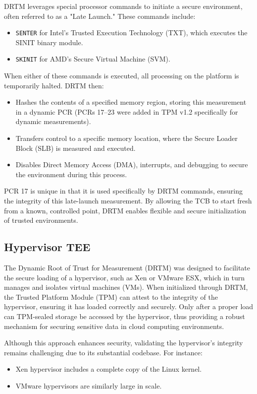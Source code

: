 DRTM leverages special processor commands to initiate a secure
environment, often referred to as a "Late Launch." These commands
include:
\begin{itemize}
    \item \texttt{SENTER} for Intel's Trusted Execution Technology
      (TXT), which executes the SINIT binary module.
    \item \texttt{SKINIT} for AMD's Secure Virtual Machine (SVM).
\end{itemize}

When either of these commands is executed, all processing on the
platform is temporarily halted. DRTM then:
\begin{itemize}
    \item Hashes the contents of a specified memory region, storing
      this measurement in a dynamic PCR (PCRs 17–23 were added in TPM
      v1.2 specifically for dynamic measurements).
    \item Transfers control to a specific memory location, where the
      Secure Loader Block (SLB) is measured and executed.
    \item Disables Direct Memory Access (DMA), interrupts, and
      debugging to secure the environment during this process.
\end{itemize}

PCR 17 is unique in that it is used specifically by DRTM commands,
ensuring the integrity of this late-launch measurement. By allowing
the TCB to start fresh from a known, controlled point, DRTM enables
flexible and secure initialization of trusted environments.

\subsection{Hypervisor TEE}

The Dynamic Root of Trust for Measurement (DRTM) was designed to
facilitate the secure loading of a hypervisor, such as Xen or VMware
ESX, which in turn manages and isolates virtual machines (VMs). When
initialized through DRTM, the Trusted Platform Module (TPM) can attest
to the integrity of the hypervisor, ensuring it has loaded correctly
and securely. Only after a proper load can TPM-sealed storage be
accessed by the hypervisor, thus providing a robust mechanism for
securing sensitive data in cloud computing environments.

Although this approach enhances security, validating the hypervisor's
integrity remains challenging due to its substantial codebase. For
instance:
\begin{itemize}
    \item Xen hypervisor includes a complete copy of the Linux kernel.
    \item VMware hypervisors are similarly large in scale.
\end{itemize}

